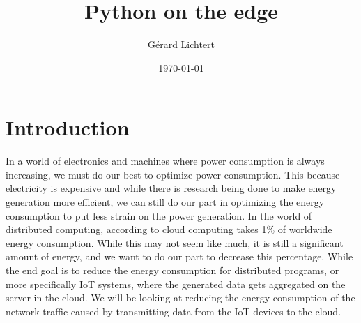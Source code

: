\documentclass[a4paper]{article}
\title{Python on the edge}
\author{Gérard Lichtert}
\date{\today}
\begin{document}
\maketitle
\tableofcontents
\newpage
\raggedright{}


\section{Introduction}
In a world of electronics and machines where power consumption is always increasing, we must do our best to optimize power consumption. This because electricity is expensive and while there is research being done to make energy generation more efficient, we can still do our part in optimizing the energy consumption to put less strain on the power generation. In the world of distributed computing, according to \cite{cloudcomputingenergycrisis} cloud computing takes 1\% of worldwide energy consumption. While this may not seem like much, it is still a significant amount of energy, and we want to do our part to decrease this percentage. While the end goal is to reduce the energy consumption for distributed programs, or more specifically IoT systems, where the generated data gets aggregated on the server in the cloud. We will be looking at reducing the energy consumption of the network traffic caused by transmitting data from the IoT devices to the cloud.
\end{document}
